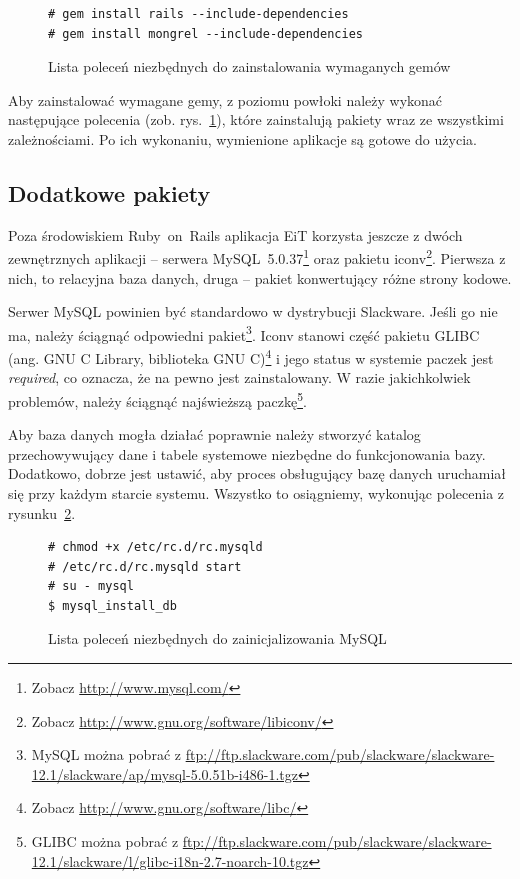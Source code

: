 \documentclass[a4paper,12pt,oneside]{report}
\begin{document}
\begin{figure}[h]
\centering
\begin{verbatim}# gem install rails --include-dependencies
# gem install mongrel --include-dependencies\end{verbatim}
\caption{Lista poleceń niezbędnych do zainstalowania wymaganych gemów\label{fig:gems}}
\end{figure}
Aby zainstalować wymagane gemy, z poziomu powłoki należy wykonać następujące polecenia (zob. rys.~\ref{fig:gems}), które zainstalują pakiety wraz ze wszystkimi zależnościami. Po ich wykonaniu, wymienione aplikacje są gotowe do użycia.

\subsection{Dodatkowe pakiety}
\label{sub:dodatkowe}
Poza środowiskiem Ruby~on~Rails aplikacja EiT korzysta jeszcze z dwóch zewnętrznych aplikacji -- serwera MySQL~5.0.37\footnote{Zobacz \url{http://www.mysql.com/}} oraz pakietu iconv\footnote{Zobacz \url{http://www.gnu.org/software/libiconv/}}. Pierwsza z nich, to relacyjna baza danych, druga -- pakiet konwertujący różne strony kodowe.

Serwer MySQL powinien być standardowo w dystrybucji Slackware. Jeśli go nie ma, należy ściągnąć odpowiedni pakiet\footnote{MySQL można pobrać z \url{ftp://ftp.slackware.com/pub/slackware/slackware-12.1/slackware/ap/mysql-5.0.51b-i486-1.tgz}}. Iconv stanowi część pakietu GLIBC (ang. GNU C Library, biblioteka GNU C)\footnote{Zobacz \url{http://www.gnu.org/software/libc/}} i jego status w systemie paczek jest \emph{required}, co oznacza, że na pewno jest zainstalowany. W razie jakichkolwiek problemów, należy ściągnąć najświeższą paczkę\footnote{GLIBC można pobrać z \url{ftp://ftp.slackware.com/pub/slackware/slackware-12.1/slackware/l/glibc-i18n-2.7-noarch-10.tgz}}.

Aby baza danych mogła działać poprawnie należy stworzyć katalog przechowywujący dane i tabele systemowe niezbędne do funkcjonowania bazy. Dodatkowo, dobrze jest ustawić, aby proces obsługujący bazę danych uruchamiał się przy każdym starcie systemu. Wszystko to osiągniemy, wykonując polecenia z rysunku~\ref{fig:mysql}.
\begin{figure}[h]
\begin{verbatim}# chmod +x /etc/rc.d/rc.mysqld
# /etc/rc.d/rc.mysqld start
# su - mysql
$ mysql_install_db\end{verbatim}
\caption{Lista poleceń niezbędnych do zainicjalizowania MySQL\label{fig:mysql}}
\end{figure}
\end{document}
